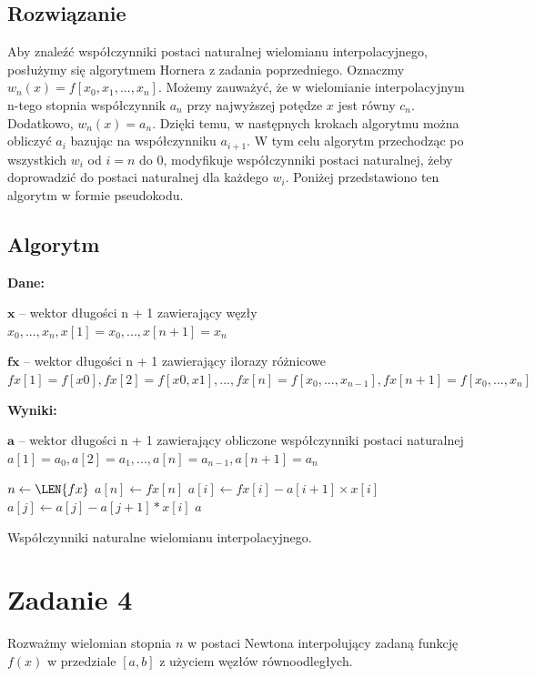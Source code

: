 \documentclass[12pt]{article}
\begin{document}
\subsection{Rozwiązanie}
Aby znaleźć współczynniki postaci naturalnej wielomianu interpolacyjnego, posłużymy się algorytmem Hornera z zadania poprzedniego. Oznaczmy $w_n(x)=f[x_0, x_1, ..., x_n]$. Możemy zauważyć, że w wielomianie interpolacyjnym n-tego stopnia współczynnik $a_n$ przy najwyższej potędze $x$ jest równy $c_n$. Dodatkowo, $w_n(x)=a_n$. Dzięki temu, w następnych krokach algorytmu można obliczyć $a_i$ bazując na współczynniku $a_{i+1}$. W tym celu algorytm przechodząc po wszystkich $w_i$ od $i=n$ do $0$, modyfikuje współczynniki postaci naturalnej, żeby doprowadzić do postaci naturalnej dla każdego $w_i$. Poniżej przedstawiono ten algorytm w formie pseudokodu.

\subsection{Algorytm}
\textbf{Dane:}\par
$\textbf{x}$ – wektor długości n + 1 zawierający węzły $x_0, ..., x_n, x[1]=x_0,..., x[n+1]=x_n$\par
$\textbf{fx}$ – wektor długości n + 1 zawierający ilorazy różnicowe
$fx[1]=f[x0],
fx[2]=f[x0, x1],..., fx[n]=f[x_0, ..., x_{n−1}], fx[n+1]=f[x_0, ..., x_n]$\newline\par
\textbf{Wyniki:}\par
$\textbf{a}$ – wektor długości n + 1 zawierający obliczone współczynniki postaci naturalnej
$a[1]=a_0,
a[2]=a_1, ..., a[n]=a_{n−1}, a[n+1]=a_n$
\begin{algorithm}[h]
	\DontPrintSemicolon
	 {
	 	$n \gets \LEN{fx}$\;
	 	$a[n] \gets fx[n]$\;
	 	 {
	 		$a[i] \gets fx[i] - a[i+1] \times x[i]$\; 
	 		 {
	 			$a[j] \gets a[j] - a[j+1] * x[i]$\;
	 		}	
	 	}
	 	\KwRet $a$\;
	}
	\caption{Współczynniki naturalne wielomianu interpolacyjnego.}
	\label{alg:zad3}
	\end{algorithm}
	
	
\section{Zadanie 4}
Rozważmy wielomian stopnia $n$ w postaci Newtona interpolujący zadaną funkcję $f(x)$ w przedziale $[a, b]$ z użyciem węzłów równoodległych.
\end{document}
